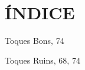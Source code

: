




\chapter*{ÍNDICE}

{ \setlength{\parindent}{0pt}  %
	
Toques Bons, 74

Toques Ruins, 68, 74


	
	
	
	
} %


